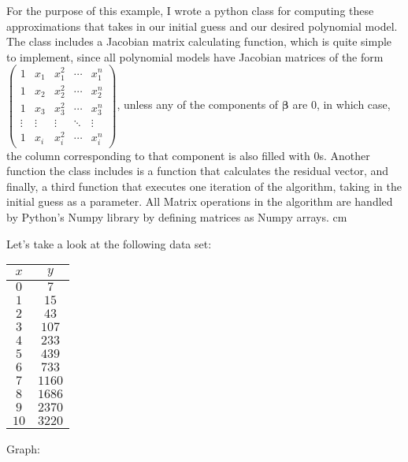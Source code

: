 \documentclass[12pt]{article}
\begin{document}
For the purpose of this example, I wrote a python class for computing these approximations that takes in our initial guess and our desired polynomial model. The class includes a Jacobian matrix calculating function, which is quite simple to implement, since all polynomial models have Jacobian matrices of the form $\begin{pmatrix}1 & x_1 & x_1^2 & \cdots & x_1^n \\ 1 & x_2 & x_2^2 & \cdots & x_2^n  \\ 1 & x_3 & x_3^2 & \cdots & x_3^n \\ \vdots & \vdots & \vdots & \ddots & \vdots \\ 1 & x_i & x_i^2 & \cdots & x_i^n \end{pmatrix}$, unless any of the components of $\boldsymbol{\beta}$ are $0$, in which case, the column corresponding to that component is also filled with $0$s. Another function the class includes is a function that calculates the residual vector, and finally, a third function that executes one iteration of the algorithm, taking in the initial guess as a parameter. All Matrix operations in the algorithm are handled by Python's Numpy library by defining matrices as Numpy arrays. 
 cm

Let's take a look at the following data set:

\begin{tabular}{c|c}
$x$ & $y$ \\ \hline
$0$ & $7$ \\
$1$ & $15$ \\
$2$ & $43$ \\
$3$ & $107$ \\
$4$ & $233$ \\
$5$ & $439$ \\
$6$ & $733$ \\
$7$ & $1160$ \\
$8$ & $1686$ \\
$9$ & $2370$ \\
$10$ & $3220$ \\
\end{tabular}

\vskip 0.2cm

Graph:

\end{document}
